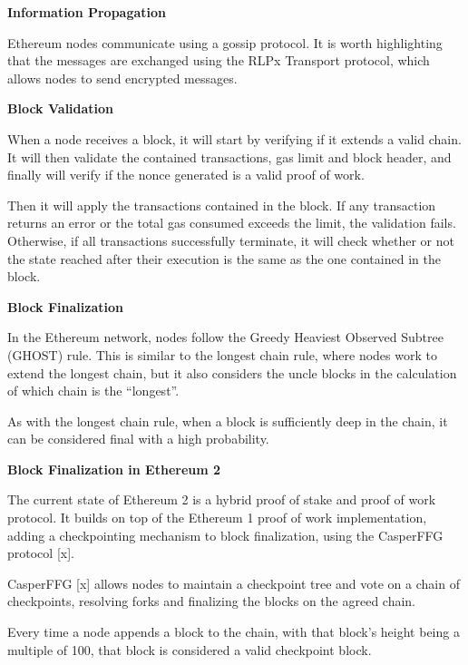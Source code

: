 \vspace{0.25cm}


\textbf{Information Propagation}

Ethereum nodes communicate using a gossip protocol. It is worth highlighting that the messages are exchanged using the RLPx Transport protocol, which allows nodes to send encrypted messages.

\vspace{0.25cm}

\textbf{Block Validation}

When a node receives a block, it will start by verifying if it extends a valid chain. It will then validate the contained transactions, gas limit and block header, and finally will verify if the nonce generated is a valid proof of work.

Then it will apply the transactions contained in the block. If any transaction returns an error or the total gas consumed exceeds the limit, the validation fails. Otherwise, if all transactions successfully terminate, it will check whether or not the state reached after their execution is the same as the one contained in the block.


\vspace{0.25cm}

\textbf{Block Finalization}

In the Ethereum network, nodes follow the Greedy Heaviest Observed Subtree (GHOST) rule. This is similar to the longest chain rule, where nodes work to extend the longest chain, but it also considers the uncle blocks in the calculation of which chain is the “longest”.

As with the longest chain rule, when a block is sufficiently deep in the chain, it can be considered final with a high probability.

\vspace{0.25cm}

\textbf{Block Finalization in Ethereum 2}

The current state of Ethereum 2 is a hybrid proof of stake and proof of work protocol. It builds on top of the Ethereum 1 proof of work implementation, adding a checkpointing mechanism to block finalization, using the CasperFFG protocol [x].

CasperFFG [x] allows nodes to maintain a checkpoint tree and vote on a chain of checkpoints, resolving forks and finalizing the blocks on the agreed chain.

Every time a node appends a block to the chain, with that block’s height being a multiple of 100, that block is considered a valid checkpoint block.

